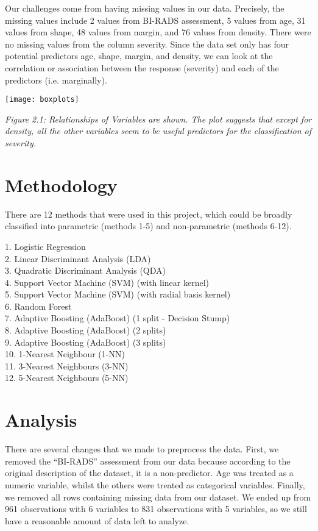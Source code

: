 \documentclass[11pt]{article}
\begin{document}
	Our challenges come from having missing values in our data. Precisely, the missing values include 2 values from BI-RADS assessment, 5 values from age, 31 values from shape, 48 values from margin, and 76 values from density. There were no missing values from the column severity. Since the data set only has four potential predictors age, shape, margin, and density, we can look at the correlation or association between the response (severity) and each of the predictors (i.e. marginally).
	
	\texttt{[image: boxplots]}
	
	\textit{Figure 2.1: Relationships of Variables are shown. The plot suggests that except for density, all the other variables seem to be useful predictors for the classification of severity.}
	
	\section{Methodology}
	There are 12 methods that were used in this project, which could be broadly classified into parametric (methods 1-5) and non-parametric (methods 6-12).
	
	1. Logistic Regression \\
	2. Linear Discriminant Analysis (LDA) \\
	3. Quadratic Discriminant Analysis (QDA) \\
	4. Support Vector Machine (SVM) (with linear kernel) \\
	5. Support Vector Machine (SVM) (with radial basis kernel) \\
	6. Random Forest \\
	7. Adaptive Boosting (AdaBoost) (1 split - Decision Stump) \\
	8. Adaptive Boosting (AdaBoost) (2 splits) \\
	9. Adaptive Boosting (AdaBoost) (3 splits) \\
	10. 1-Nearest Neighbour (1-NN) \\
	11. 3-Nearest Neighbours (3-NN) \\
	12. 5-Nearest Neighbours (5-NN) \\
	
	\section{Analysis}
	There are several changes that we made to preprocess the data. First, we removed the  ``BI-RADS'' assessment from our data because according to the original description of the dataset, it is a non-predictor. Age was treated as a numeric variable, whilst the others were treated as categorical variables. Finally, we removed all rows containing missing data from our dataset. We ended up from 961 observations with 6 variables to 831 observations with 5 variables, so we still have a reasonable amount of data left to analyze.
	
\end{document}
